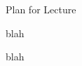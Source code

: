 \begin{frame}{Plan for Lecture \thislecture}

\begin{itemize}
{\small
\item blah
\item blah
}
\end{itemize}

\end{frame}

